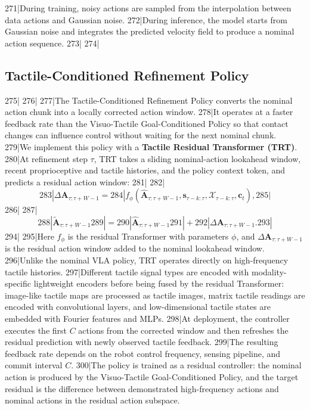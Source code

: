 271|During training, noisy actions are sampled from the interpolation between data actions and Gaussian noise.
272|During inference, the model starts from Gaussian noise and integrates the predicted velocity field to produce a nominal action sequence.
273|
274|\subsection{Tactile-Conditioned Refinement Policy}
275|\label{sec:tactile_refinement_policy}
276|
277|The Tactile-Conditioned Refinement Policy converts the nominal action chunk into a locally corrected action window.
278|It operates at a faster feedback rate than the Visuo-Tactile Goal-Conditioned Policy so that contact changes can influence control without waiting for the next nominal chunk.
279|We implement this policy with a \textbf{Tactile Residual Transformer (TRT)}.
280|At refinement step $\tau$, TRT takes a sliding nominal-action lookahead window, recent proprioceptive and tactile histories, and the policy context token, and predicts a residual action window:
281|
282|\begin{equation}
283|    \Delta \mathbf{A}_{\tau:\tau+W-1} =
284|    f_{\phi}(\hat{\mathbf{A}}_{\tau:\tau+W-1}, \mathbf{s}_{\tau-k:\tau}, \mathcal{X}_{\tau-k:\tau}, \mathbf{c}_t),
285|\end{equation}
286|
287|\begin{equation}
288|    \tilde{\mathbf{A}}_{\tau:\tau+W-1}
289|    =
290|    \hat{\mathbf{A}}_{\tau:\tau+W-1}
291|    +
292|    \Delta \mathbf{A}_{\tau:\tau+W-1}.
293|\end{equation}
294|
295|Here $f_{\phi}$ is the residual Transformer with parameters $\phi$, and $\Delta \mathbf{A}_{\tau:\tau+W-1}$ is the residual action window added to the nominal lookahead window.
296|Unlike the nominal VLA policy, TRT operates directly on high-frequency tactile histories.
297|Different tactile signal types are encoded with modality-specific lightweight encoders before being fused by the residual Transformer: image-like tactile maps are processed as tactile images, matrix tactile readings are encoded with convolutional layers, and low-dimensional tactile states are embedded with Fourier features and MLPs.
298|At deployment, the controller executes the first $C$ actions from the corrected window and then refreshes the residual prediction with newly observed tactile feedback.
299|The resulting feedback rate depends on the robot control frequency, sensing pipeline, and commit interval $C$.
300|The policy is trained as a residual controller: the nominal action is produced by the Visuo-Tactile Goal-Conditioned Policy, and the target residual is the difference between demonstrated high-frequency actions and nominal actions in the residual action subspace.
